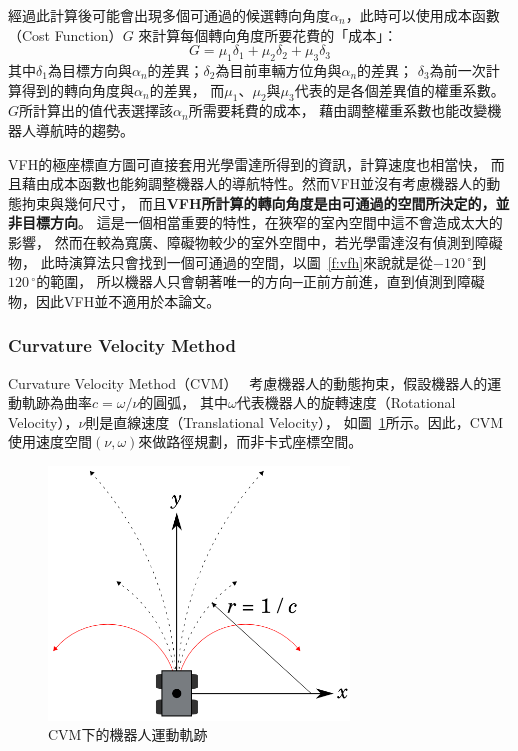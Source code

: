 經過此計算後可能會出現多個可通過的候選轉向角度$\alpha_n$，此時可以使用成本函數（Cost Function）$G$
來計算每個轉向角度所要花費的「成本」：
\begin{equation}
	G = \mu_1 \delta_1 + \mu_2 \delta_2 + \mu_3 \delta_3
\end{equation}
其中$\delta_1$為目標方向與$\alpha_n$的差異；$\delta_2$為目前車輛方位角與$\alpha_n$的差異；
$\delta_3$為前一次計算得到的轉向角度與$\alpha_n$的差異，
而$\mu_1$、$\mu_2$與$\mu_3$代表的是各個差異值的權重系數。
$G$所計算出的值代表選擇該$\alpha_n$所需要耗費的成本，
藉由調整權重系數也能改變機器人導航時的趨勢。

VFH的極座標直方圖可直接套用光學雷達所得到的資訊，計算速度也相當快，
而且藉由成本函數也能夠調整機器人的導航特性。然而VFH並沒有考慮機器人的動態拘束與幾何尺寸，
而且\textbf{VFH所計算的轉向角度是由可通過的空間所決定的，並非目標方向}。
這是一個相當重要的特性，在狹窄的室內空間中這不會造成太大的影響，
然而在較為寬廣、障礙物較少的室外空間中，若光學雷達沒有偵測到障礙物，
此時演算法只會找到一個可通過的空間，以圖~\ref{f:vfh}來說就是從$-120\,^{\circ}$到$120\,^{\circ}$的範圍，
所以機器人只會朝著唯一的方向─正前方前進，直到偵測到障礙物，因此VFH並不適用於本論文。

\subsubsection{Curvature Velocity Method}
Curvature Velocity Method（CVM）~\cite{Simmons:1996:CVM}
考慮機器人的動態拘束，假設機器人的運動軌跡為曲率$c=\omega/\nu$的圓弧，
其中$\omega$代表機器人的旋轉速度（Rotational Velocity），$\nu$則是直線速度（Translational Velocity），
如圖~\ref{f:cvm_curvature}所示。因此，CVM使用速度空間$(\nu,\omega)$來做路徑規劃，而非卡式座標空間。
\begin{figure}
	\centering
	\includegraphics[width=8cm]{figures/CVM1}
	\caption{CVM下的機器人運動軌跡}
	\label{f:cvm_curvature}
\end{figure}

